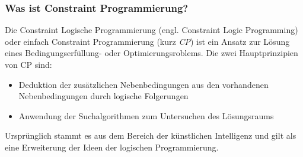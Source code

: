 \documentclass[hyperref={pdfpagelabels=false}]{beamer}
\begin{document}
\nocite{CSP}
\nocite{CPforScheduling}
\begin{frame}

\frametitle{Was ist Constraint Programmierung?}

\begin{block}{}
    Die {\color{darkred} Constraint Logische Programmierung} (engl. Constraint Logic Programming) oder einfach {\color{darkred}Constraint Programmierung} (kurz {\color{darkred} \it CP}) ist ein Ansatz zur Lösung eines Bedingungserfüllung- oder Optimierungsroblems. Die zwei Hauptprinzipien von CP sind:\\
    \begin{itemize}
    \item Deduktion der zusätzlichen Nebenbedingungen aus den vorhandenen Nebenbedingungen durch logische Folgerungen
    \item Anwendung der Suchalgorithmen zum Untersuchen des Lösungsraums
    \end{itemize}
\end{block}

{\centering
Ursprünglich stammt es aus dem Bereich der künstlichen Intelligenz und gilt als eine Erweiterung
der Ideen der logischen Programmierung.
}

\end{frame}

\end{document}

